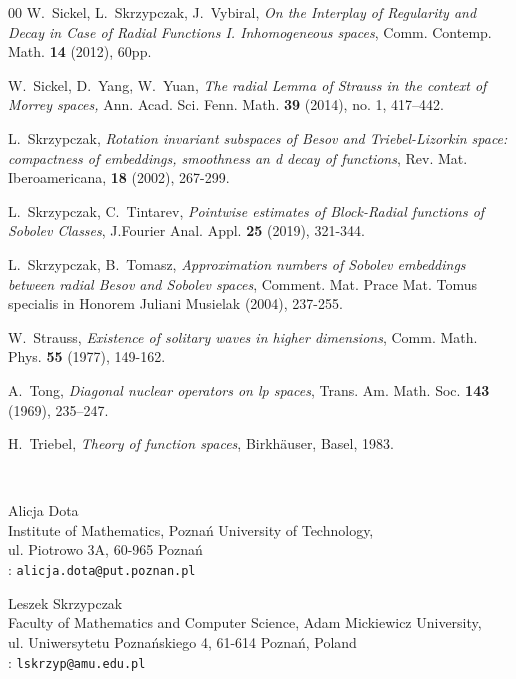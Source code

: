 \documentclass[12pt]{article}
\begin{document}
\begin{thebibliography}{00}
 W.~Sickel, L.~Skrzypczak, J.~Vybiral, {\sl  On the Interplay of Regularity and Decay in Case of Radial Functions I. Inhomogeneous spaces}, Comm. Contemp. Math. \textbf{14} (2012),  60pp. 

W.~Sickel, D.~Yang, W.~Yuan, 
	{\sl The radial Lemma of Strauss in the context of Morrey spaces,} 
	{ Ann. Acad. Sci. Fenn. Math.} {\bf 39} (2014), no. 1, 417–442.


 L.~Skrzypczak, {\sl Rotation invariant subspaces of Besov and
	Triebel-Lizorkin space: compactness of embeddings, 
	smoothness an d decay of functions}, Rev. Mat. Iberoamericana, \textbf{18} (2002), 267-299.


 L.~Skrzypczak, C.~Tintarev, {\sl  Pointwise estimates of Block-Radial functions of Sobolev Classes}, J.Fourier Anal. Appl. {\bf 25} (2019), 321-344.

 L.~Skrzypczak, B.~Tomasz, {\sl Approximation numbers of Sobolev embeddings between radial Besov and Sobolev spaces}, Comment. Mat. Prace Mat. Tomus specialis in Honorem Juliani Musielak (2004), 237-255.


 W.~Strauss, {\sl Existence of solitary waves in higher dimensions}, Comm. Math. Phys. \textbf{55} (1977), 149-162. 

A.~Tong, {\sl Diagonal nuclear operators on  lp  spaces}, Trans. Am. Math. Soc. \textbf{143} (1969), 235–247.

H.~Triebel, {\sl Theory of function spaces}, Birkh\"auser,
Basel, 1983.
\end{thebibliography}



\bigskip\bigskip~
\small

\noindent Alicja Dota\\
\noindent Institute of Mathematics, Pozna\'n University of Technology, \\
\noindent ul. Piotrowo 3A,  60-965 Pozna\'n\\ 
:  \texttt{alicja.dota@put.poznan.pl}

\bigskip


\noindent Leszek Skrzypczak\\
\noindent  Faculty of Mathematics and Computer Science,
Adam Mickiewicz University, \\
\noindent ul. Uniwersytetu Pozna\'nskiego 4, 61-614 Pozna\'n,
Poland\\
:  \texttt{lskrzyp@amu.edu.pl}


\end{document}

